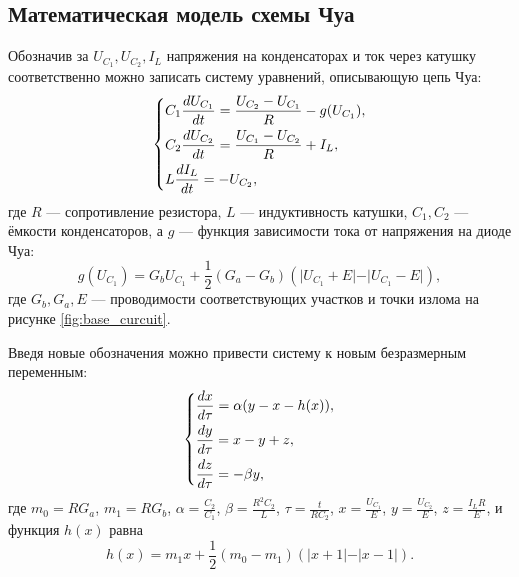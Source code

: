 \documentclass[12pt]{article}
\begin{document}
\subsection*{Математическая модель схемы Чуа}
Обозначив за $U_{C_1}, U_{C_2}, I_{L}$ напряжения на конденсаторах и ток через катушку соответственно можно записать систему уравнений, описывающую цепь Чуа:
\begin{equation}
	\begin{dcases}
		C_1 \frac{d U_{C_1}}{dt} = \frac{U_{C_2} - U_{C_1}}{R} - g(U_{C_1}), \\
		C_2 \frac{d U_{C_2}}{dt} = \frac{U_{C_1} - U_{C_2}}{R} + I_L,        \\
		L \frac{d I_L}{dt} = -U_{C_2},
	\end{dcases}
	\label{eq:chua_system}
\end{equation}
где $R$ --- сопротивление резистора, $L$ --- индуктивность катушки, $C_1, C_2$ --- ёмкости конденсаторов, а $g$ --- функция зависимости тока от напряжения
на диоде Чуа:
\[
	g(U_{C_1}) = G_b U_{C_1} + \frac{1}{2} \left( G_a - G_b \right) \left( \vert U_{C_1} + E \vert - \vert U_{C_1} - E \vert \right),
\]
где $G_b, G_a, E$ --- проводимости соответствующих участков и точки излома на рисунке \ref{fig:base_curcuit}.

Введя новые обозначения можно привести систему к новым безразмерным переменным:
\begin{equation}
	\begin{dcases}
		\frac{dx}{d \tau} = \alpha(y - x - h(x)), \\
		\frac{dy}{d \tau} = x - y + z,            \\
		\frac{dz}{d \tau} = -\beta y,             \\
	\end{dcases}
	\label{eq:chua_system_}
\end{equation}
где $m_0 = R G_a$, $m_1 = R G_b$, $\alpha = \frac{C_2}{C_1}$, $\beta = \frac{R^2 C_2}{L}$,
$\tau = \frac{t}{R C_2}$, $x = \frac{U_{C_1}}{E}$, $y = \frac{U_{C_2}}{E}$, $z = \frac{I_L R}{E}$, и функция $h(x)$ равна
\[
	h(x) = m_1 x + \frac{1}{2}(m_0 - m_1)(\vert x + 1 \vert - \vert x - 1 \vert ).
\]
\end{document}
